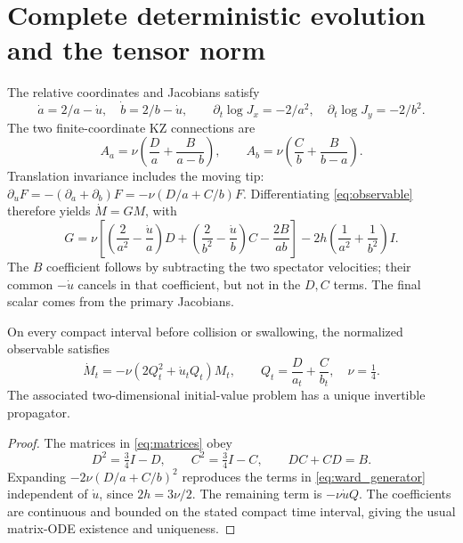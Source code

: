 \section{Complete deterministic evolution and the tensor norm}
\label{sec:evolution}

The relative coordinates and Jacobians satisfy
\begin{equation}
 \dot a=2/a-\dot u,\quad \dot b=2/b-\dot u,\qquad
 \partial_t\log J_x=-2/a^2,\quad
 \partial_t\log J_y=-2/b^2.
 \label{eq:geometry_rates}
\end{equation}
The two finite-coordinate KZ connections are
\begin{equation}
 A_a=\nu\left(\frac Da+\frac B{a-b}\right),\qquad
 A_b=\nu\left(\frac Cb+\frac B{b-a}\right).
\end{equation}
Translation invariance includes the moving tip:
$\partial_uF=-(\partial_a+\partial_b)F=-\nu(D/a+C/b)F$.
Differentiating \eqref{eq:observable} therefore yields $\dot M=GM$, with
\begin{equation}
 G=\nu\left[
 \left(\frac2{a^2}-\frac{\dot u}a\right)D+
 \left(\frac2{b^2}-\frac{\dot u}b\right)C-
 \frac{2B}{ab}\right]
 -2h\left(\frac1{a^2}+\frac1{b^2}\right)I.
 \label{eq:ward_generator}
\end{equation}
The $B$ coefficient follows by subtracting the two spectator velocities;
their common $-\dot u$ cancels in that coefficient, but not in the $D,C$
terms. The final scalar comes from the primary Jacobians.

\begin{proposition}
On every compact interval before collision or swallowing, the normalized
observable satisfies
\begin{equation}
 \boxed{\dot M_t=-\nu(2Q_t^2+\dot u_tQ_t)M_t,\qquad
 Q_t=\frac D{a_t}+\frac C{b_t},\quad \nu=\tfrac14.}
 \label{eq:square_reduction}
\end{equation}
The associated two-dimensional initial-value problem has a unique
invertible propagator.
\end{proposition}
\begin{proof}
The matrices in \eqref{eq:matrices} obey
\begin{equation}
 D^2=\tfrac34I-D,\qquad C^2=\tfrac34I-C,\qquad DC+CD=B.
 \label{eq:spin_identities}
\end{equation}
Expanding $-2\nu(D/a+C/b)^2$ reproduces the terms in
\eqref{eq:ward_generator} independent of $\dot u$, since
$2h=3\nu/2$. The remaining term is $-\nu\dot uQ$.
The coefficients are continuous and bounded on the stated compact time
interval, giving the usual matrix-ODE existence and uniqueness.
\end{proof}

